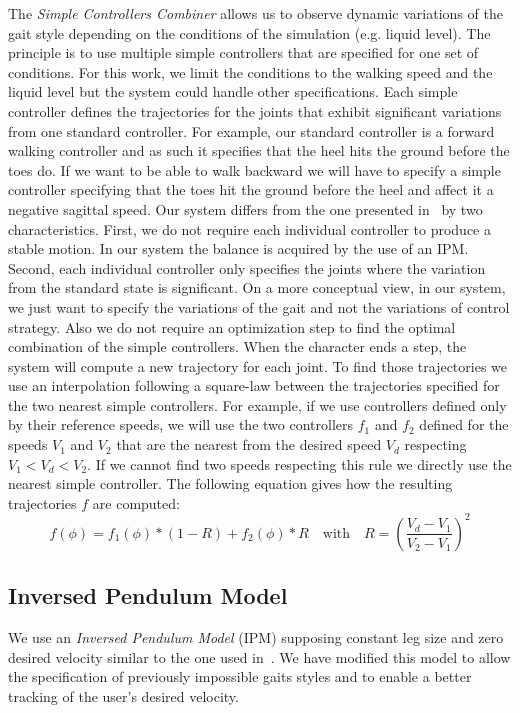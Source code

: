 \documentclass[conference]{acmsiggraph}
\begin{document}
The \textit{Simple Controllers Combiner} allows us to observe dynamic variations of the gait style depending on the conditions of the simulation (e.g. liquid level). The principle is to use multiple simple controllers that are specified for one set of conditions. For this work, we limit the conditions to the walking speed and the liquid level but the system could handle other specifications. Each simple controller defines the trajectories for the joints that exhibit significant variations from one standard controller. For example, our standard controller is a forward walking controller and as such it specifies that the heel hits the ground before the toes do. If we want to be able to walk backward we will have to specify a simple controller specifying that the toes hit the ground before the heel and affect it a negative sagittal speed. Our system differs from the one presented in~\cite{coros2009robust} by two characteristics. First, we do not require each individual controller to produce a stable motion. In our system the balance is acquired by the use of an IPM. Second, each individual controller only specifies the joints where the variation from the standard state is significant. On a more conceptual view, in our system, we just want to specify the variations of the gait and not the variations of control strategy. Also we do not require an optimization step to find the optimal combination of the simple controllers. When the character ends a step, the system will compute a new trajectory for each joint. To find those trajectories we use an interpolation following a square-law between the trajectories specified for the two nearest simple controllers. For example, if we use controllers defined only by their reference speeds, we will use the two controllers $f_1$ and $f_2$ defined for the speeds $V_1$ and $V_2$ that are the nearest from the desired speed $V_d$ respecting $V_1 < V_d < V_2$. If we cannot find two speeds respecting this rule we directly use the nearest simple controller. The following equation gives how the resulting trajectories $f$ are computed:
$$
f(\phi)=f_1(\phi)*(1-R)+f_2(\phi)*R   \quad \textrm{with} \quad   R=\left( \frac{V_d-V_1}{V_2-V_1} \right) ^2
$$

\subsection{Inversed Pendulum Model}
\label{sec:IPM}

We use an \textit{Inversed Pendulum Model} (IPM) supposing constant leg size and zero desired velocity similar to the one used in~\cite{coros2010generalized}. We have modified this model to allow the specification of previously impossible gaits styles and to enable a better tracking of the user's desired velocity. 
\end{document}
